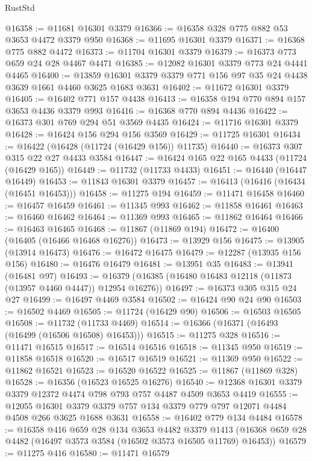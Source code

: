 \begin{lexlean}{RustStd}
\begin{coremodule}
@16358 := @11681 @16301 @3379
@16366 := @16358 @328 @775 @882 @53 @3653 @4472 @3379 @950
@16368 := @11695 @16301 @3379
@16371 := @16368 @775 @882 @4472
@16373 := @11704 @16301 @3379
@16379 := @16373 @773 @659 @24 @28 @4467 @4471
@16385 := @12082 @16301 @3379 @773 @24 @4441 @4465
@16400 := @13859 @16301 @3379 @3379 @771 @156 @97 @35 @24 @4438 @3639 @1661 @4460 @3625 @1683 @3631
@16402 := @11672 @16301 @3379
@16405 := @16402 @771 @157 @4438
@16413 := @16358 @194 @770 @894 @157 @3653 @4436 @3379 @993
@16416 := @16368 @770 @894 @4436
@16422 := @16373 @301 @769 @294 @51 @3569 @4435
@16424 := @11716 @16301 @3379
@16428 := @16424 @156 @294 @156 @3569
@16429 := @11725 @16301
@16434 := @16422 (@16428 (@11724 (@16429 @156)) @11735)
@16440 := @16373 @307 @315 @22 @27 @4433 @3584
@16447 := @16424 @165 @22 @165 @4433 (@11724 (@16429 @165))
@16449 := @11732 (@11733 @4433)
@16451 := @16440 (@16447 @16449)
@16453 := @11843 @16301 @3379
@16457 := @16413 (@16416 (@16434 (@16451 @16453)))
@16458 := @11275 @194
@16459 := @11471 @16458
@16460 := @16457 @16459
@16461 := @11345 @993
@16462 := @11858 @16461
@16463 := @16460 @16462
@16464 := @11369 @993
@16465 := @11862 @16464
@16466 := @16463 @16465
@16468 := @11867 (@11869 @194)
@16472 := @16400 (@16405 (@16466 @16468 @16276))
@16473 := @13929 @156
@16475 := @13905 (@13914 @16473)
@16476 := @16472 @16475
@16479 := @12287 (@13935 @156 @156)
@16480 := @16476 @16479
@16481 := @13951 @35
@16483 := @13941 (@16481 @97)
@16493 := @16379 (@16385 (@16480 @16483 @12118 (@11873 (@13957 @4460 @4447)) @12954 @16276))
@16497 := @16373 @305 @315 @24 @27
@16499 := @16497 @4469 @3584
@16502 := @16424 @90 @24 @90
@16503 := @16502 @4469
@16505 := @11724 (@16429 @90)
@16506 := @16503 @16505
@16508 := @11732 (@11733 @4469)
@16514 := @16366 (@16371 (@16493 (@16499 (@16506 @16508) @16453)))
@16515 := @11275 @328
@16516 := @11471 @16515
@16517 := @16514 @16516
@16518 := @11345 @950
@16519 := @11858 @16518
@16520 := @16517 @16519
@16521 := @11369 @950
@16522 := @11862 @16521
@16523 := @16520 @16522
@16525 := @11867 (@11869 @328)
@16528 := @16356 (@16523 @16525 @16276)
@16540 := @12368 @16301 @3379 @3379 @12372 @4474 @798 @793 @757 @4487 @4509 @3653 @4419
@16555 := @12055
    @16301
    @3379
    @3379
    @757
    @134
    @3379
    @779
    @797
    @12071
    @4484
    @4508
    @266
    @3625
    @1688
    @3631
@16558 := @16402 @779 @134 @4484
@16578 := @16358
    @416
    @659
    @28
    @134
    @3653
    @4482
    @3379
    @1413
    (@16368 @659 @28 @4482 (@16497 @3573 @3584 (@16502 @3573 @16505 @11769) @16453))
@16579 := @11275 @416
@16580 := @11471 @16579

\end{coremodule}
\end{lexlean}
